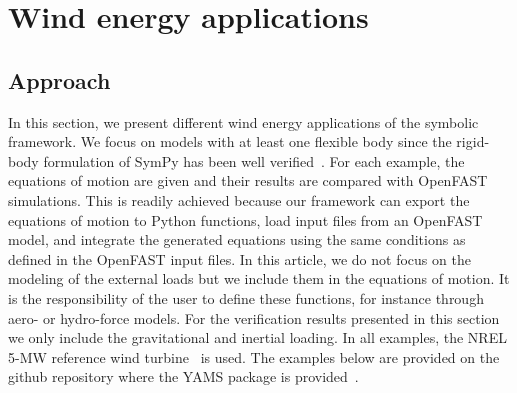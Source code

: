\documentclass[wes, manuscript]{copernicus}
\newcommand{\m}[1]{\boldsymbol{#1}}
\begin{document}




\section{Wind energy applications}
\label{sec:WEapplications}


\subsection{Approach}
In this section, we present different wind energy applications of the symbolic framework. 
We focus on models with at least one flexible body since the rigid-body formulation of SymPy has been well verified~\citep{Gede:2013}.
For each example, the equations of motion are given and their results are compared with OpenFAST~\citep{OpenFAST} simulations.
This is readily achieved because our framework can export the equations of motion to Python functions, load input files from an OpenFAST model, and integrate the generated equations using the same conditions as defined in the OpenFAST input files. 
In this article, we do not focus on the modeling of the external loads but we include them in the equations of motion.
It is the responsibility of the user to define these functions, for instance through aero- or hydro-force models.
For the verification results presented in this section we only include the gravitational and inertial loading.
In all examples, the NREL 5-MW reference wind turbine~\citep{nrel5mw} is used.
The examples below are provided on the github repository where the YAMS package is provided~\citep{WELIBgithub}.
\end{document}
